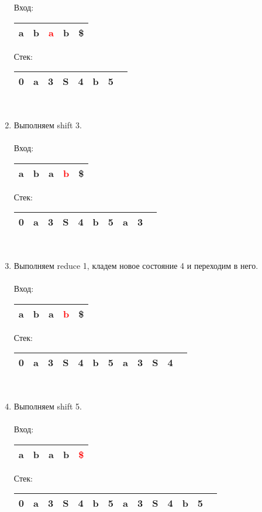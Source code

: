 \begin{example}
\begin{enumerate}
Вход: \,
\begin{tabular}[c]{ |c|c|c|c|c| } 
    \hline a & b & \textcolor{red}{a} & b & \$ \\ \hline
\end{tabular}
\qquad Стек: \,
\begin{tabular}[c]{ |c|c|c|c|c|c|c|c } 
    \hline 0 & a & 3 & S & 4 & b & 5 & \\ \hline
\end{tabular}
\\
\item Выполняем shift 3. \\ \\
Вход: \,
\begin{tabular}[c]{ |c|c|c|c|c| } 
    \hline a & b & a & \textcolor{red}{b} & \$ \\ \hline
\end{tabular}
\qquad Стек: \,
\begin{tabular}[c]{ |c|c|c|c|c|c|c|c|c|c } 
    \hline 0 & a & 3 & S & 4 & b & 5 & a & 3 & \\ \hline
\end{tabular}
\\
\item Выполняем reduce 1, кладем новое состояние 4 и переходим в него. \\ \\
Вход: \,
\begin{tabular}[c]{ |c|c|c|c|c| } 
    \hline a & b & a & \textcolor{red}{b} & \$ \\ \hline
\end{tabular}
\qquad Стек: \,
\begin{tabular}[c]{ |c|c|c|c|c|c|c|c|c|c|c|c } 
    \hline 0 & a & 3 & S & 4 & b & 5 & a & 3 & S & 4 & \\ \hline
\end{tabular}
\\
\item Выполняем shift 5. \\ \\
Вход: \,
\begin{tabular}[c]{ |c|c|c|c|c| } 
    \hline a & b & a & b & \textcolor{red}{\$} \\ \hline
\end{tabular}
\qquad Стек: \,
\begin{tabular}[c]{ |c|c|c|c|c|c|c|c|c|c|c|c|c|c } 
    \hline 0 & a & 3 & S & 4 & b & 5 & a & 3 & S & 4 & b & 5 & \\ \hline
\end{tabular}
\\

\end{enumerate}
\end{example}
